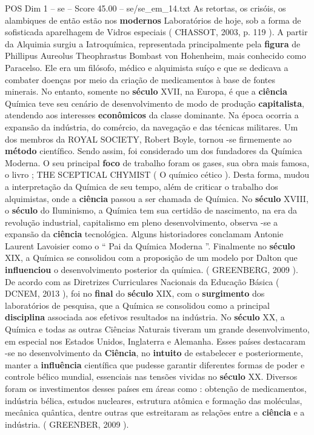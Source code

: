 \begin{textsample}{POS Dim 1 – se – Score 45.00 – se/se\_em\_14.txt}
As retortas, os crisóis, os alambiques de então estão nos \textbf{modernos} Laboratórios de hoje, sob a forma de sofisticada aparelhagem de Vidros especiais ( CHASSOT, 2003, p. 119 ).
A partir da Alquimia surgiu a Iatroquímica, representada principalmente pela \textbf{figura} de Phillipus Aureolus Theophrastus Bombast von Hohenheim, mais conhecido como Paracelso.
Ele era um filósofo, médico e alquimista suíço e que se dedicava a combater doenças por meio da criação de medicamentos à base de fontes minerais.
No entanto, somente no \textbf{século} XVII, na Europa, é que a \textbf{ciência} Química teve seu cenário de desenvolvimento de modo de produção \textbf{capitalista}, atendendo aos interesses \textbf{econômicos} da classe dominante.
Na época ocorria a expansão da indústria, do comércio, da navegação e das técnicas militares.
Um dos membros da ROYAL SOCIETY, Robert Boyle, tornou -se firmemente ao \textbf{método} científico.
Sendo assim, foi considerado um dos fundadores da Química Moderna.
O seu principal \textbf{foco} de trabalho foram os gases, sua obra mais famosa, o livro ; THE SCEPTICAL CHYMIST ( O químico cético ).
Desta forma, mudou a interpretação da Química de seu tempo, além de criticar o trabalho dos alquimistas, onde a \textbf{ciência} passou a ser chamada de Química.
No \textbf{século} XVIII, o \textbf{século} do Iluminismo, a Química tem sua certidão de nascimento, na era da revolução industrial, capitalismo em pleno desenvolvimento, observa -se a expansão da \textbf{ciência} tecnológica.
Alguns historiadores conclamam Antonie Laurent Lavoisier como o “ Pai da Química Moderna ”.
Finalmente no \textbf{século} XIX, a Química se consolidou com a proposição de um modelo por Dalton que \textbf{influenciou} o desenvolvimento posterior da química. ( GREENBERG, 2009 ).
De acordo com as Diretrizes Curriculares Nacionais da Educação Básica ( DCNEM, 2013 ), foi no \textbf{final} do \textbf{século} XIX, com o \textbf{surgimento} dos laboratórios de pesquisa, que a Química se consolidou como a principal \textbf{disciplina} associada aos efetivos resultados na indústria.
No \textbf{século} XX, a Química e todas as outras Ciências Naturais tiveram um grande desenvolvimento, em especial nos Estados Unidos, Inglaterra e Alemanha.
Esses países destacaram -se no desenvolvimento da \textbf{Ciência}, no \textbf{intuito} de estabelecer e posteriormente, manter a \textbf{influência} científica que pudesse garantir diferentes formas de poder e controle bélico mundial, essenciais nas tensões vividas no \textbf{século} XX.
Diversos foram os investimentos desses países em áreas como : obtenção de medicamentos, indústria bélica, estudos nucleares, estrutura atômica e formação das moléculas, mecânica quântica, dentre outras que estreitaram as relações entre a \textbf{ciência} e a indústria. ( GREENBER, 2009 ).

\end{textsample}
